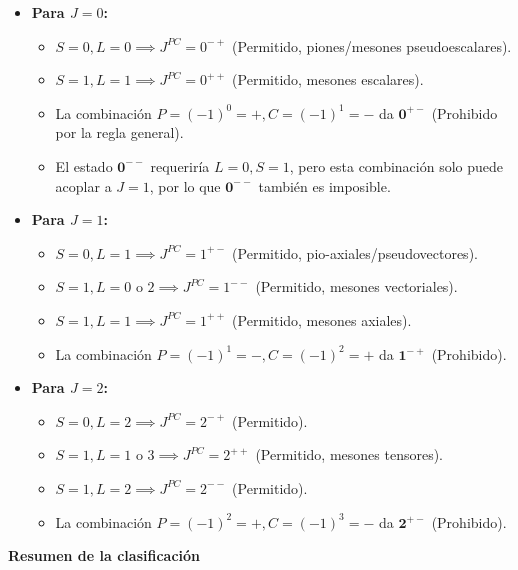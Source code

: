\begin{problema}
\begin{itemize}
    \item \textbf{Para $J = 0$:}
    \begin{itemize}
        \item $S=0, L=0 \implies J^{PC} = 0^{-+}$ (Permitido, piones/mesones pseudoescalares).
        \item $S=1, L=1 \implies J^{PC} = 0^{++}$ (Permitido, mesones escalares).
        \item La combinación $P = (-1)^0 = +, C = (-1)^1 = -$ da $\mathbf{0^{+-}}$ (Prohibido por la regla general).
        \item El estado $\mathbf{0^{--}}$ requeriría $L=0, S=1$, pero esta combinación solo puede acoplar a $J=1$, por lo que $\mathbf{0^{--}}$ también es imposible.
    \end{itemize}

    \item \textbf{Para $J = 1$:}
    \begin{itemize}
        \item $S=0, L=1 \implies J^{PC} = 1^{+-}$ (Permitido, pio-axiales/pseudovectores).
        \item $S=1, L=0 \text{ o } 2 \implies J^{PC} = 1^{--}$ (Permitido, mesones vectoriales).
        \item $S=1, L=1 \implies J^{PC} = 1^{++}$ (Permitido, mesones axiales).
        \item La combinación $P = (-1)^1 = -, C = (-1)^2 = +$ da $\mathbf{1^{-+}}$ (Prohibido).
    \end{itemize}

    \item \textbf{Para $J = 2$:}
    \begin{itemize}
        \item $S=0, L=2 \implies J^{PC} = 2^{-+}$ (Permitido).
        \item $S=1, L=1 \text{ o } 3 \implies J^{PC} = 2^{++}$ (Permitido, mesones tensores).
        \item $S=1, L=2 \implies J^{PC} = 2^{--}$ (Permitido).
        \item La combinación $P = (-1)^2 = +, C = (-1)^3 = -$ da $\mathbf{2^{+-}}$ (Prohibido).
    \end{itemize}
\end{itemize}

\textbf{Resumen de la clasificación}


\end{problema}
